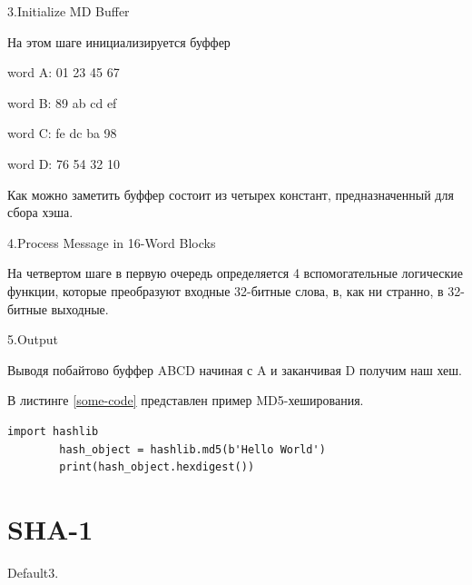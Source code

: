 \documentclass[a4paper, 12pt, oneside]{scrartcl}
\begin{document}
	3.Initialize MD Buffer\par
	На этом шаге инициализируется буффер\par
	word A: 01 23 45 67\par
	word B: 89 ab cd ef\par
	word C: fe dc ba 98\par
	word D: 76 54 32 10\par
	Как можно заметить буффер состоит из четырех констант, предназначенный для сбора хэша.\par
	4.Process Message in 16-Word Blocks\par
	На четвертом шаге в первую очередь определяется 4 вспомогательные логические функции, которые преобразуют входные 32-битные слова, в, как ни странно, в 32-битные выходные.\par

	5.Output\par
	Выводя побайтово буффер ABCD начиная с A и заканчивая D получим наш хеш.\par
	В листинге \ref{some-code} представлен пример MD5-хеширования.\par
	
	\begin{lstlisting}[label=some-code,caption= MD5]
		import hashlib
		hash_object = hashlib.md5(b'Hello World')
		print(hash_object.hexdigest())
	\end{lstlisting}
	\section{SHA-1}\label{sec:section3}
	Default3.
	
	
	
\end{document}
